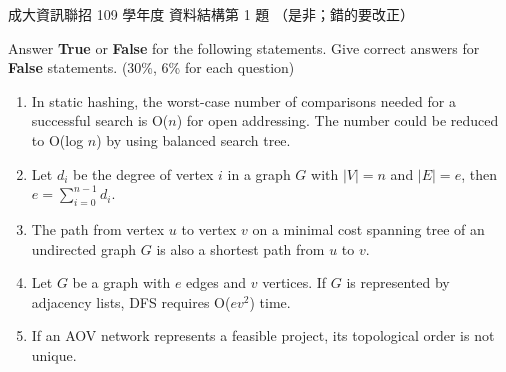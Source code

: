 \begin{pastexam}[label={px:ncku-109-prog-01}]{成大資訊聯招 109 學年度 資料結構第 1 題}
（是非；錯的要改正）

Answer \textbf{True} or \textbf{False} for the following statements. Give correct answers for
\textbf{False} statements. (30\%, 6\% for each question)
\begin{enumerate}[label=(\arabic*)]
\item In static hashing, the worst-case number of comparisons needed for a successful search is
O($n$) for open addressing. The number could be reduced to O(log $n$) by using balanced search
tree.
\item Let $d_i$ be the degree of vertex $i$ in a graph $G$ with $|V|=n$ and $|E|=e$, then
$e=\sum_{i=0}^{n-1}d_i$.
\item The path from vertex $u$ to vertex $v$ on a minimal cost spanning tree of an undirected
graph $G$ is also a shortest path from $u$ to $v$.
\item Let $G$ be a graph with $e$ edges and $v$ vertices. If $G$ is represented by adjacency
lists, DFS requires O($ev^2$) time.
\item If an AOV network represents a feasible project, its topological order is not unique.
\end{enumerate}
\end{pastexam}

